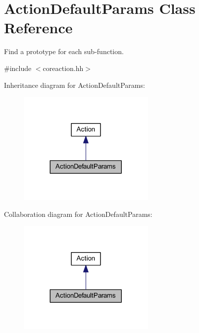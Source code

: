 \hypertarget{class_action_default_params}{}\section{Action\+Default\+Params Class Reference}
\label{class_action_default_params}


Find a prototype for each sub-\/function.  




{\ttfamily \#include $<$coreaction.\+hh$>$}



Inheritance diagram for Action\+Default\+Params\+:
\nopagebreak
\begin{figure}[H]
\begin{center}
\leavevmode
\includegraphics[width=188pt]{class_action_default_params__inherit__graph}
\end{center}
\end{figure}


Collaboration diagram for Action\+Default\+Params\+:
\nopagebreak
\begin{figure}[H]
\begin{center}
\leavevmode
\includegraphics[width=188pt]{class_action_default_params__coll__graph}
\end{center}
\end{figure}
